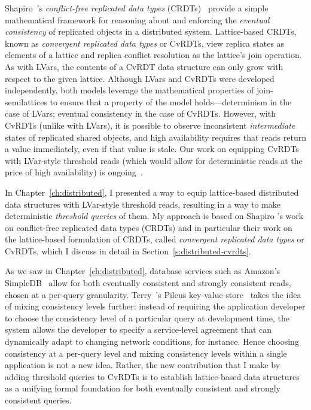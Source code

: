 Shapiro~\etal's \emph{conflict-free replicated data types}
(CRDTs)~ provide a simple mathematical framework
for reasoning about and enforcing the \emph{eventual consistency} of
replicated objects in a distributed system.  Lattice-based CRDTs,
known as \emph{convergent replicated data types} or CvRDTs, view
replica states as elements of a lattice and replica conflict
resolution as the lattice's join operation.  As with LVars, the
contents of a CvRDT data structure can only grow with respect to the
given lattice.  Although LVars and CvRDTs were developed
independently, both models leverage the mathematical properties of
join-semilattices to ensure that a property of the model
holds---determinism in the case of LVars; eventual consistency in the
case of CvRDTs.  However, with CvRDTs (unlike with LVars), it is
possible to observe inconsistent \emph{intermediate} states of
replicated shared objects, and high availability requires that reads
return a value immediately, even if that value is stale.  Our work on
equipping CvRDTs with LVar-style threshold reads (which would allow
for deterministic reads at the price of high availability) is
ongoing~\cite{joining-wodet, lvars-dissertation}.  \fi

\ifdefined\DISSSERTATION
In Chapter~\ref{ch:distributed}, I presented a way to equip
lattice-based distributed data structures with LVar-style threshold
reads, resulting in a way to make deterministic \emph{threshold
  queries} of them.  My approach is based on Shapiro \etal's work on
conflict-free replicated data types (CRDTs) \cite{crdts,crdts-tr} and
in particular their work on the lattice-based formulation of CRDTs,
called \emph{convergent replicated data types} or CvRDTs, which I
discuss in detail in Section~\ref{s:distributed-cvrdts}.

As we saw in Chapter~\ref{ch:distributed}, database services such as
Amazon's SimpleDB~\cite{simpledb-vogels-article} allow for both
eventually consistent and strongly consistent reads, chosen at a
per-query granularity.  Terry~\etal's Pileus key-value
store~\cite{pileus} takes the idea of mixing consistency levels
further: instead of requiring the application developer to choose the
consistency level of a particular query at development time, the
system allows the developer to specify a service-level agreement that
can dynamically adapt to changing network conditions, for instance.
Hence choosing consistency at a per-query level and mixing consistency
levels within a single application is not a new idea.  Rather, the new
contribution that I make by adding threshold queries to CvRDTs is to
establish lattice-based data structures as a unifying formal
foundation for both eventually consistent and strongly consistent
queries.
\fi

